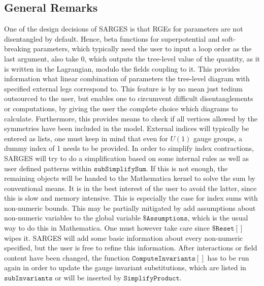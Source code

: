 \documentclass{scrartcl}
\begin{document}
\subsection{General Remarks}
One of the design decisions of SARGES is that RGEs for parameters are not disentangled by default. Hence, beta functions for superpotential and soft-breaking parameters, which typically need the user to input a loop order as the last argument, also take 0, which outputs the tree-level value of the quantity, as it is written in the Lagrangian, modulo the fields coupling to it. This provides information what linear combination of parameters the tree-level diagram with specified external legs correspond to. This feature is by no mean just tedium outsourced to the user, but enables one to circumvent difficult disentanglements or computations, by giving the user the complete choice which diagrams to calculate. Furthermore, this provides means to check if all vertices allowed by the symmetries have been included in the model.
\newline
External indices will typically be entered as lists, one must keep in mind that even for $U(1)$ gauge groups, a dummy index of 1 needs to be provided. In order to simplify index contractions, SARGES will try to do a simplification based on some internal rules as well as user defined patterns within $\mathtt{subSimplifySum}$. If this is not enough, the remaining objects will be handed to the Mathematica kernel to solve the sum by conventional means. It is in the best interest of the user to avoid the latter, since this is slow and memory intensive. This is especially the case for index sums with non-numeric bounds. This may be partially mitigated by add assumptions about non-numeric variables to the global variable  $\mathtt{\$Assumptions}$, which is the usual way to do this in Mathematica. One must however take care since $\mathtt{\$Reset[]}$ wipes it. SARGES will add some basic information about every non-numeric specified, but the user is free to refine this information.
\newline
After interactions or field content have been changed, the function $\mathtt{ComputeInvariants[]}$ has to be run again in order to update the gauge invariant substitutions, which are listed in $\mathtt{subInvariants}$ or will be inserted by $\mathtt{SimplifyProduct}$.
\end{document}
